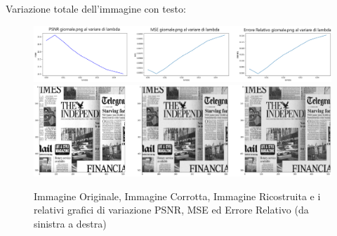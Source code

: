 Variazione totale dell'immagine con testo:
\begin{figure}[H]
    \centering
    \includegraphics[width=\textwidth]{imgRel/graficoGiornale.png}
    \includegraphics[width=\textwidth]{imgRel/giornale.png}
    \caption{Immagine Originale, Immagine Corrotta, Immagine Ricostruita e i relativi grafici di variazione PSNR, MSE ed Errore Relativo (da sinistra a destra)}
\end{figure}